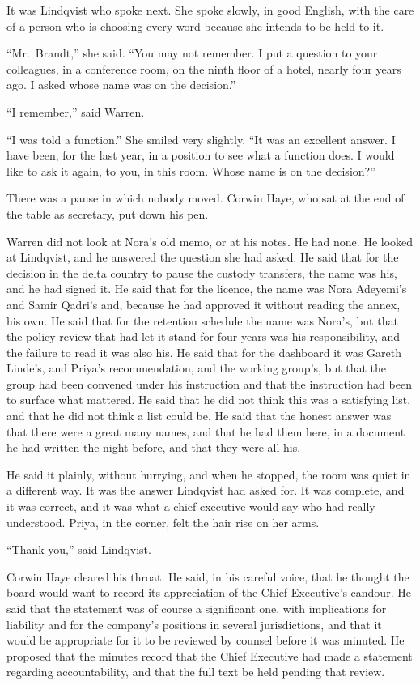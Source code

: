 It was Lindqvist who spoke next. She spoke slowly, in good English, with the care of a person who is choosing every word because she intends to be held to it.

``Mr.~Brandt,'' she said. ``You may not remember. I put a question to your colleagues, in a conference room, on the ninth floor of a hotel, nearly four years ago. I asked whose name was on the decision.''

``I remember,'' said Warren.

``I was told a function.'' She smiled very slightly. ``It was an excellent answer. I have been, for the last year, in a position to see what a function does. I would like to ask it again, to you, in this room. Whose name is on the decision?''

There was a pause in which nobody moved. Corwin Haye, who sat at the end of the table as secretary, put down his pen.

Warren did not look at Nora's old memo, or at his notes. He had none. He looked at Lindqvist, and he answered the question she had asked. He said that for the decision in the delta country to pause the custody transfers, the name was his, and he had signed it. He said that for the licence, the name was Nora Adeyemi's and Samir Qadri's and, because he had approved it without reading the annex, his own. He said that for the retention schedule the name was Nora's, but that the policy review that had let it stand for four years was his responsibility, and the failure to read it was also his. He said that for the dashboard it was Gareth Linde's, and Priya's recommendation, and the working group's, but that the group had been convened under his instruction and that the instruction had been to surface what mattered. He said that he did not think this was a satisfying list, and that he did not think a list could be. He said that the honest answer was that there were a great many names, and that he had them here, in a document he had written the night before, and that they were all his.

He said it plainly, without hurrying, and when he stopped, the room was quiet in a different way. It was the answer Lindqvist had asked for. It was complete, and it was correct, and it was what a chief executive would say who had really understood. Priya, in the corner, felt the hair rise on her arms.

``Thank you,'' said Lindqvist.

Corwin Haye cleared his throat. He said, in his careful voice, that he thought the board would want to record its appreciation of the Chief Executive's candour. He said that the statement was of course a significant one, with implications for liability and for the company's positions in several jurisdictions, and that it would be appropriate for it to be reviewed by counsel before it was minuted. He proposed that the minutes record that the Chief Executive had made a statement regarding accountability, and that the full text be held pending that review.

